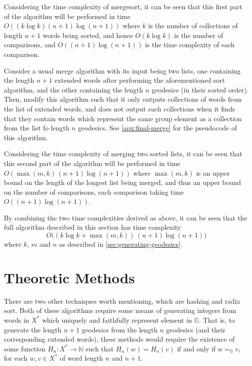 Considering the time complexity of mergesort, it can be seen that this first part of the algorithm will be performed in time $O( (k \log k) (n+1) \log (n+1) )$ where $k$ is the number of collections of length $n+1$ words being sorted, and hence $O(k\log k)$ is the number of comparisons, and $O((n+1) \log (n+1))$ is the time complexity of each comparison.

Consider a usual merge algorithm with its input being two lists, one containing the length $n+1$ extended words after performing the aforementioned sort algorithm, and the other containing the length $n$ geodesics (in their sorted order).
Then, modify this algorithm such that it only outputs collections of words from the list of extended words, and does not output such collections when it finds that they contain words which represent the same group element as a collection from the list fo length $n$ geodesics.
See \cref{apx:final-merge} for the pseudocode of this algorithm.

Considering the time complexity of merging two sorted lists, it can be seen that this second part of the algorithm will be performed in time $O(\max(m,k) \, (n+1) \log (n+1))$ where $\max(m,k)$ is an upper bound on the length of the longest list being merged, and thus an upper bound on the number of comparisons, each comparison taking time $O((n+1)\log (n+1))$.

By combining the two time complexities derived as above, it can be seen that the full algorithm described in this section has time complexity
\[O\Big((k\log k + \max(m,k)) \, (n+1) \log (n+1) \Big)\]
where $k$, $m$ and $n$ as described in \cref{sec:generating-geodesics}.

\section{Theoretic Methods}
\label{sec:theoretic-methods}

There are two other techniques worth mentioning, which are hashing and radix sort.
Both of these algorithms require some means of generating integers from words in $X^\ast$ which uniquely and faithfully represent element in $\mathbb{G}$.
That is, to generate the length $n+1$ geodesics from the length $n$ geodesics (and their corresponding extended words), these methods would require the existence of some function $H_n : X^\ast \to \mathbb{N}$ such that $H_n(w) = H_n(v)$ if and only if $w =_\mathbb{G} v$, for each $w,v \in X^\ast$ of word length $n$ and $n+1$.

